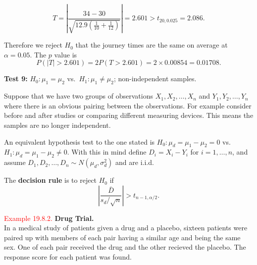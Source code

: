 \documentclass[
]{book}
\begin{document}
\[T = \left| \frac{34-30}{ \sqrt{ 12.9 \left( \frac{1}{10} + \frac{1}{12} \right) }} \right| = 2.601 > t_{20,0.025} = 2.086.\]

Therefore we reject \(H_0\) that the journey times are the same on average at \(\alpha = 0.05\). The \(p\) value is\\

\[P(|T| > 2.601) = 2 P(T> 2.601) = 2 \times 0.00854 = 0.01708.\]

\hfill\break

\leavevmode{}%
{\textbf{Test 9:}} \(H_0: \mu_1 = \mu_2\) vs.~\(H_1: \mu_1 \neq \mu_2\); non-independent samples.

Suppose that we have two groups of observations \(X_1,X_2,\dots,X_n\) and \(Y_1,Y_2,\dots,Y_n\) where there is an obvious pairing between the observations. For example consider before and after studies or comparing different measuring devices. This means the samples are no longer independent.

An equivalent hypothesis test to the one stated is \(H_0: \mu_d = \mu_1 - \mu_2 = 0\) vs.~\(H_1: \mu_d = \mu_1 - \mu_2 \neq 0\). With this in mind define \(D_i = X_i - Y_i\) for \(i=1,\dots,n\), and assume \(D_1,D_2,\dots,D_n \sim N(\mu_d, \sigma_d^2)\) and are i.i.d.

The {\textbf{decision rule}} is to reject \(H_0\) if\\

\[\left| \frac{\bar{D}}{s_d/\sqrt{n}} \right| > t_{n-1,\alpha/2}.\]

\leavevmode{}%
\textcolor{red}{Example 19.8.2.}
{\textbf{Drug Trial.}}\\
In a medical study of patients given a drug and a placebo, sixteen patients were paired up with members of each pair having a similar age and being the same sex. One of each pair received the drug and the other recieved the placebo. The response score for each patient was found.
\end{document}
